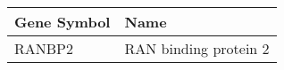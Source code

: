 \begin{tabular}{ll}
\toprule
Gene Symbol &                  Name \\
\midrule
     RANBP2 & RAN binding protein 2 \\
\bottomrule
\end{tabular}
